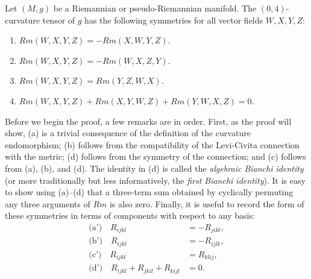 \begin{proposition}
\label{prop:curvature-tensor-symmetries}
Let $(M,g)$ be a Riemannian or pseudo-Riemannian manifold. The $(0,4)$-curvature tensor of $g$ has the following symmetries for all vector fields $W, X, Y, Z$:
\begin{enumerate}[label=(\alph*)]
\item $Rm(W,X,Y,Z) = -Rm(X,W,Y,Z)$.
\item $Rm(W,X,Y,Z) = -Rm(W,X,Z,Y)$.
\item $Rm(W,X,Y,Z) = Rm(Y,Z,W,X)$.
\item $Rm(W,X,Y,Z) + Rm(X,Y,W,Z) + Rm(Y,W,X,Z) = 0$.
\end{enumerate}
\end{proposition}

Before we begin the proof, a few remarks are in order. First, as the proof will show, (a) is a trivial consequence of the definition of the curvature endomorphism; (b) follows from the compatibility of the Levi-Civita connection with the metric; (d) follows from the symmetry of the connection; and (c) follows from (a), (b), and (d). The identity in (d) is called the \textit{algebraic Bianchi identity} (or more traditionally but less informatively, the \textit{first Bianchi identity}). It is easy to show using (a)--(d) that a three-term sum obtained by cyclically permuting any three arguments of $Rm$ is also zero. Finally, it is useful to record the form of these symmetries in terms of components with respect to any basis:
\begin{align*}
\text{(a')} \quad R_{ijkl} &= -R_{jikl}, \\
\text{(b')} \quad R_{ijkl} &= -R_{ijlk}, \\
\text{(c')} \quad R_{ijkl} &= R_{klij}, \\
\text{(d')} \quad R_{ijkl} + R_{jkil} + R_{kijl} &= 0.
\end{align*}

